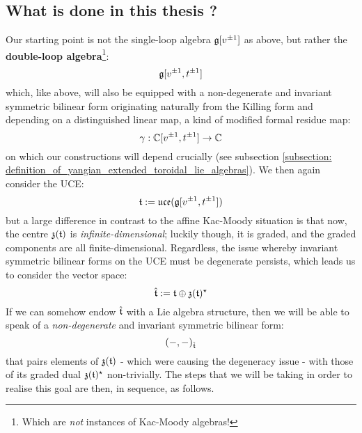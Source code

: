     \subsection{What is done in this thesis ?}
        Our starting point is not the single-loop algebra $\mathfrak{g}[v^{\pm 1}]$ as above, but rather the \textbf{double-loop algebra}\footnote{Which are \textit{not} instances of Kac-Moody algebras!}:
            $$\mathfrak{g}[v^{\pm 1}, t^{\pm 1}]$$
        which, like above, will also be equipped with a non-degenerate and invariant symmetric bilinear form originating naturally from the Killing form and depending on a distinguished linear map, a kind of modified formal residue map:
            $$\gamma: \mathbb{C}[v^{\pm 1}, t^{\pm 1}] \to \mathbb{C}$$
        on which our constructions will depend crucially (see subsection \ref{subsection: definition_of_yangian_extended_toroidal_lie_algebras}). We then again consider the UCE:
            $$\mathfrak{t} := \mathfrak{uce}(\mathfrak{g}[v^{\pm 1}, t^{\pm 1}])$$
        but a large difference in contrast to the affine Kac-Moody situation is that now, the centre $\mathfrak{z}(\mathfrak{t})$ is \textit{infinite-dimensional}; luckily though, it is graded, and the graded components are all finite-dimensional. Regardless, the issue whereby invariant symmetric bilinear forms on the UCE must be degenerate persists, which leads us to consider the vector space:
            $$\hat{\mathfrak{t}} := \mathfrak{t} \oplus \mathfrak{z}(\mathfrak{t})^{\star}$$
        If we can somehow endow $\hat{\mathfrak{t}}$ with a Lie algebra structure, then we will be able to speak of a \textit{non-degenerate} and invariant symmetric bilinear form:
            $$(-, -)_{\hat{\mathfrak{t}}}$$
        that pairs elements of $\mathfrak{z}(\mathfrak{t})$ - which were causing the degeneracy issue - with those of its graded dual $\mathfrak{z}(\mathfrak{t})^{\star}$ non-trivially. The steps that we will be taking in order to realise this goal are then, in sequence, as follows.
